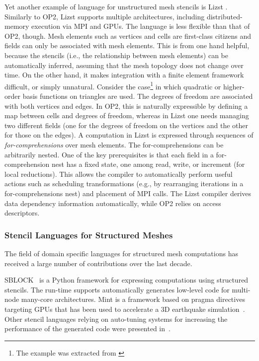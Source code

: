 Yet another example of language for unstructured mesh stencils is Lizst \citep{lizst}. Similarly to OP2, Lizst supports multiple architectures, including distributed-memory execution via MPI and GPUs. The language is less flexible than that of OP2, though. Mesh elements such as vertices and cells are first-class citizens and fields can only be associated with mesh elements. This is from one hand helpful, because the stencils (i.e., the relationship between mesh elements) can be automatically inferred, assuming that the mesh topology does not change over time. On the other hand, it makes integration with a finite element framework difficult, or simply unnatural. Consider the case\footnote{The example was extracted from \cite{florian-thesis}} in which quadratic or higher-order basis functions on triangles are used. The degrees of freedom are associated with both vertices and edges. In OP2, this is naturally expressible by defining a map between cells and degrees of freedom, whereas in Lizst one needs managing two different fields (one for the degrees of freedom on the vertices and the other for those on the edges). A computation in Lizst is expressed through sequences of {\em for-comprehensions} over mesh elements. The for-comprehensions can be arbitrarily nested. One of the key prerequisites is that each field in a for-comprehension nest has a fixed state, one among read, write, or increment (for local reductions). This allows the compiler to automatically perform useful actions such as scheduling transformations (e.g., by rearranging iterations in a for-comprehensions nest) and placement of MPI calls. The Lizst compiler derives data dependency information automatically, while OP2 relies on access descriptors. 

\subsubsection{Stencil Languages for Structured Meshes}
The field of domain specific languages for structured mesh computations has received a large number of contributions over the last decade. 

SBLOCK~\citep{sblock-cite} is a Python framework for expressing computations using structured stencils. The run-time supports automatically generates low-level code for multi-node many-core architectures. Mint is a framework based on pragma directives targeting GPUs that has been used to accelerate a 3D earthquake simulation~\citep{mint-simulation-cite}. Other stencil languages relying on auto-tuning systems for increasing the performance of the generated code were presented in~\cite{zhang-mueller-cite,datta-cite,patus}. 

